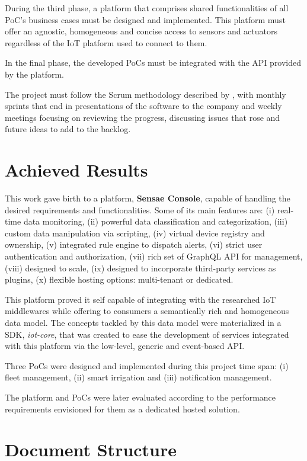 During the third phase, a platform that comprises shared functionalities of all \gls{PoC}'s business cases must be designed and implemented. This platform must offer an agnostic, homogeneous and concise access to sensors and actuators regardless of the \gls{IoT} platform used to connect to them.

In the final phase, the developed \gls{PoC}s must be integrated with the \gls{API} provided by the platform.

The project must follow the Scrum methodology described by \cite{schwaber1997scrum}, with monthly sprints that end in presentations of the software to the company and weekly meetings focusing on reviewing the progress, discussing issues that rose and future ideas to add to the backlog.

\section{Achieved Results}
\label{sec:introduction:achieved_results}

This work gave birth to a platform, \textbf{Sensae Console}, capable of handling the desired requirements and functionalities. Some of its main features are: (i) real-time data monitoring, (ii) powerful data classification and categorization, (iii) custom data manipulation via scripting, (iv) virtual device registry and ownership, (v) integrated rule engine to dispatch alerts, (vi) strict user authentication and authorization, (vii) rich set of GraphQL \gls{API} for management, (viii) designed to scale, (ix) designed to incorporate third-party services as plugins, (x) flexible hosting options: multi-tenant or dedicated.

This platform proved it self capable of integrating with the researched \gls{IoT} middlewares while offering to consumers a semantically rich and homogeneous data model. The concepts tackled by this data model were materialized in a \gls{SDK}, \textit{iot-core}, that was created to ease the development of services integrated with this platform via the low-level, generic and event-based \gls{API}.

Three \gls{PoC}s were designed and implemented during this project time span: (i) fleet management, (ii) smart irrigation and (iii) notification management.

The platform and \gls{PoC}s were later evaluated according to the performance requirements envisioned for them as a dedicated hosted solution.

\section{Document Structure}
\label{sec:introduction:document_structure}

